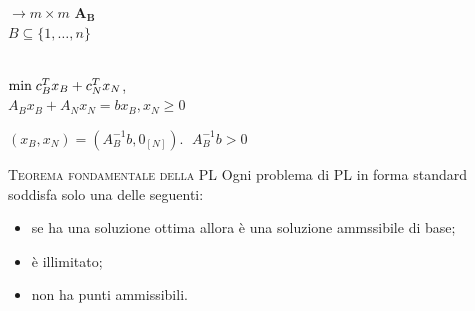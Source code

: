 %
%
\begin{frame}
 \pause $\longrightarrow m\times m $ $\mathbf{A_{B}}$ \\ $B\subseteq\{1,\dots,n\}$ \\
\pause
{}\\
\begin{center}
$\text{min\;} c^{T}_{B}x_{B}+c^{T}_{N}x_{N}$,\\
$A_{B}x_{B}+A_{N}x_{N} = b$$x_{B}, x_{N}\geq0$
\end{center}
\pause
{}$(x_{B},x_{N})=(A_{B}^{-1}b,0_{[N]})$. $\;A_{B}^{-1}b>0$
\end{frame}
%
%
\begin{frame}[t]{\textsc{Teorema fondamentale della PL}}
\pause
Ogni problema di PL in forma standard soddisfa solo una delle seguenti:
\begin{itemize}
	\item se ha una soluzione ottima allora è una soluzione ammssibile di base; 
	\item è illimitato;
	\item non ha punti ammissibili.
\end{itemize}
\end{frame}
%
%
